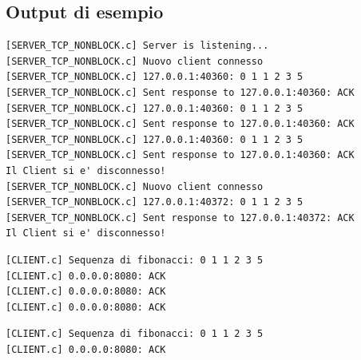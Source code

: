 \documentclass[a4paper,12pt]{article}
\begin{document}
\subsection{Output di esempio}

\begin{lstlisting}[style=output,caption={Output server - due client sequenziali}]
[SERVER_TCP_NONBLOCK.c] Server is listening...
[SERVER_TCP_NONBLOCK.c] Nuovo client connesso
[SERVER_TCP_NONBLOCK.c] 127.0.0.1:40360: 0 1 1 2 3 5
[SERVER_TCP_NONBLOCK.c] Sent response to 127.0.0.1:40360: ACK
[SERVER_TCP_NONBLOCK.c] 127.0.0.1:40360: 0 1 1 2 3 5
[SERVER_TCP_NONBLOCK.c] Sent response to 127.0.0.1:40360: ACK
[SERVER_TCP_NONBLOCK.c] 127.0.0.1:40360: 0 1 1 2 3 5
[SERVER_TCP_NONBLOCK.c] Sent response to 127.0.0.1:40360: ACK
Il Client si e' disconnesso!
[SERVER_TCP_NONBLOCK.c] Nuovo client connesso
[SERVER_TCP_NONBLOCK.c] 127.0.0.1:40372: 0 1 1 2 3 5
[SERVER_TCP_NONBLOCK.c] Sent response to 127.0.0.1:40372: ACK
Il Client si e' disconnesso!
\end{lstlisting}
\FloatBarrier

\begin{lstlisting}[style=output,caption={Output client A - ./client 5 3}]
[CLIENT.c] Sequenza di fibonacci: 0 1 1 2 3 5
[CLIENT.c] 0.0.0.0:8080: ACK
[CLIENT.c] 0.0.0.0:8080: ACK
[CLIENT.c] 0.0.0.0:8080: ACK
\end{lstlisting}
\FloatBarrier

\begin{lstlisting}[style=output,caption={Output client B - ./client 5 1}]
[CLIENT.c] Sequenza di fibonacci: 0 1 1 2 3 5
[CLIENT.c] 0.0.0.0:8080: ACK
\end{lstlisting}
\FloatBarrier
\end{document}
